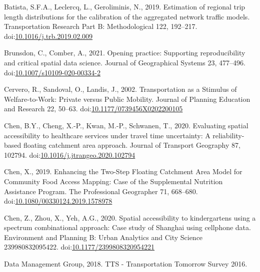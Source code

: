 \documentclass[]{elsarticle} %
\newlength{\cslhangindent}
\newlength{\cslentryspacingunit} %
\newenvironment{CSLReferences}[2] %
 {%
  \setlength{\parindent}{0pt}
  \ifodd #1
  \let\oldpar\par
  \def\par{\hangindent=\cslhangindent\oldpar}
  \fi
  \setlength{\parskip}{#2\cslentryspacingunit}
 }%
 {}
\begin{document}
\begin{CSLReferences}{1}{0}
\leavevmode{}%
Batista, S.F.A., Leclercq, L., Geroliminis, N., 2019. Estimation of
regional trip length distributions for the calibration of the aggregated
network traffic models. Transportation Research Part B: Methodological
122, 192--217.
doi:\href{https://doi.org/10.1016/j.trb.2019.02.009}{10.1016/j.trb.2019.02.009}

\leavevmode{}%
Brunsdon, C., Comber, A., 2021. Opening practice: Supporting
reproducibility and critical spatial data science. Journal of
Geographical Systems 23, 477--496.
doi:\href{https://doi.org/10.1007/s10109-020-00334-2}{10.1007/s10109-020-00334-2}

\leavevmode{}%
Cervero, R., Sandoval, O., Landis, J., 2002. Transportation as a
{Stimulus} of {Welfare}-to-{Work}: {Private} versus {Public} {Mobility}.
Journal of Planning Education and Research 22, 50--63.
doi:\href{https://doi.org/10.1177/0739456X0202200105}{10.1177/0739456X0202200105}

\leavevmode{}%
Chen, B.Y., Cheng, X.-P., Kwan, M.-P., Schwanen, T., 2020. Evaluating
spatial accessibility to healthcare services under travel time
uncertainty: {A} reliability-based floating catchment area approach.
Journal of Transport Geography 87, 102794.
doi:\href{https://doi.org/10.1016/j.jtrangeo.2020.102794}{10.1016/j.jtrangeo.2020.102794}

\leavevmode{}%
Chen, X., 2019. Enhancing the {Two}-{Step} {Floating} {Catchment} {Area}
{Model} for {Community} {Food} {Access} {Mapping}: {Case} of the
{Supplemental} {Nutrition} {Assistance} {Program}. The Professional
Geographer 71, 668--680.
doi:\href{https://doi.org/10.1080/00330124.2019.1578978}{10.1080/00330124.2019.1578978}

\leavevmode{}%
Chen, Z., Zhou, X., Yeh, A.G., 2020. Spatial accessibility to
kindergartens using a spectrum combinational approach: {Case} study of
{Shanghai} using cellphone data. Environment and Planning B: Urban
Analytics and City Science 239980832095422.
doi:\href{https://doi.org/10.1177/2399808320954221}{10.1177/2399808320954221}

\leavevmode{}%
Data Management Group, 2018. {TTS} - {Transportation} {Tomorrow}
{Survey} 2016.


\end{CSLReferences}
\end{document}
